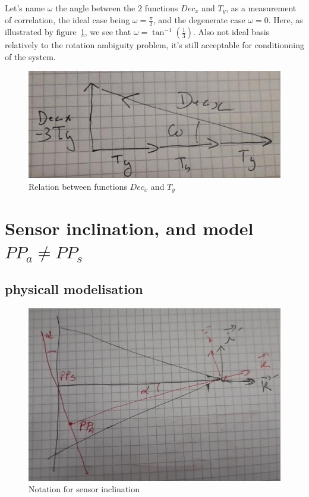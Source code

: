 Let's name $\omega$ the angle between the $2$ functions  $Dec_x$ and $T_y$,  as a measurement of correlation, the ideal case being
$\omega=\frac{\pi}{2}$, and the degenerate case $\omega=0$.  Here, as illustrated by
figure~\ref{fig:DecTy}, we see that $\omega=\tan^{-1}({\frac13})$. Also not ideal basis relatively to
the rotation ambiguity problem, it's still acceptable for conditionning of the system.

\begin{figure}
\centering
	\includegraphics[width=12cm]{Methods/Images/DecxTy.jpg}\caption{Relation between functions $Dec_x$ and $T_y$}
	\label{fig:DecTy}
\end{figure}





\section{Sensor inclination, and  model $PP_a\neq PP_s$ }
\label{SenIncl}


\subsection{physicall modelisation}

\begin{figure}
\centering
\includegraphics[width=12cm]{Methods/Images/Plan_Incl_PPaPPs.jpg} \caption{Notation for sensor inclination}
	\label{fig:PlaneIncl}
\end{figure}

